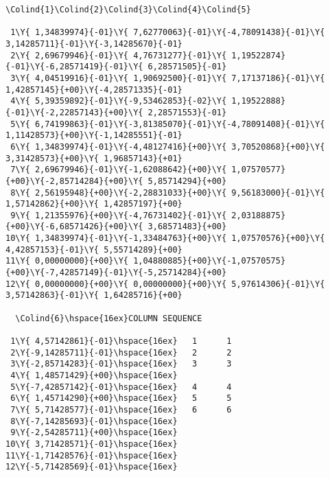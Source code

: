 \begin{landscape}
\begin{Verbatim}[commandchars=\\\{\},codes={\catcode`$=3\catcode`_=8}]
  \Colind{1}\Colind{2}\Colind{3}\Colind{4}\Colind{5}

 1\Y{ 1,34839974}{-01}\Y{ 7,62770063}{-01}\Y{-4,78091438}{-01}\Y{ 3,14285711}{-01}\Y{-3,14285670}{-01}
 2\Y{ 2,69679946}{-01}\Y{ 4,76731277}{-01}\Y{ 1,19522874}{-01}\Y{-6,28571419}{-01}\Y{ 6,28571505}{-01}
 3\Y{ 4,04519916}{-01}\Y{ 1,90692500}{-01}\Y{ 7,17137186}{-01}\Y{ 1,42857145}{+00}\Y{-4,28571335}{-01}
 4\Y{ 5,39359892}{-01}\Y{-9,53462853}{-02}\Y{ 1,19522888}{-01}\Y{-2,22857143}{+00}\Y{ 2,28571553}{-01}
 5\Y{ 6,74199863}{-01}\Y{-3,81385070}{-01}\Y{-4,78091408}{-01}\Y{ 1,11428573}{+00}\Y{-1,14285551}{-01}
 6\Y{ 1,34839974}{-01}\Y{-4,48127416}{+00}\Y{ 3,70520868}{+00}\Y{ 3,31428573}{+00}\Y{ 1,96857143}{+01}
 7\Y{ 2,69679946}{-01}\Y{-1,62088642}{+00}\Y{ 1,07570577}{+00}\Y{-2,85714284}{+00}\Y{ 5,85714294}{+00}
 8\Y{ 2,56195948}{+00}\Y{-2,28831033}{+00}\Y{ 9,56183000}{-01}\Y{ 1,57142862}{+00}\Y{ 1,42857197}{+00}
 9\Y{ 1,21355976}{+00}\Y{-4,76731402}{-01}\Y{ 2,03188875}{+00}\Y{-6,68571426}{+00}\Y{ 3,68571483}{+00}
10\Y{ 1,34839974}{-01}\Y{-1,33484763}{+00}\Y{ 1,07570576}{+00}\Y{ 4,42857153}{-01}\Y{ 5,55714289}{+00}
11\Y{ 0,00000000}{+00}\Y{ 1,04880885}{+00}\Y{-1,07570575}{+00}\Y{-7,42857149}{-01}\Y{-5,25714284}{+00}
12\Y{ 0,00000000}{+00}\Y{ 0,00000000}{+00}\Y{ 5,97614306}{-01}\Y{ 3,57142863}{-01}\Y{ 1,64285716}{+00}

  \Colind{6}\hspace{16ex}COLUMN SEQUENCE

 1\Y{ 4,57142861}{-01}\hspace{16ex}   1      1
 2\Y{-9,14285711}{-01}\hspace{16ex}   2      2
 3\Y{-2,85714283}{-01}\hspace{16ex}   3      3
 4\Y{ 1,48571429}{+00}\hspace{16ex}
 5\Y{-7,42857142}{-01}\hspace{16ex}   4      4
 6\Y{ 1,45714290}{+00}\hspace{16ex}   5      5
 7\Y{ 5,71428577}{-01}\hspace{16ex}   6      6
 8\Y{-7,14285693}{-01}\hspace{16ex}
 9\Y{-2,54285711}{+00}\hspace{16ex}
10\Y{ 3,71428571}{-01}\hspace{16ex}
11\Y{-1,71428576}{-01}\hspace{16ex}
12\Y{-5,71428569}{-01}\hspace{16ex}
\end{Verbatim}

\end{landscape}
